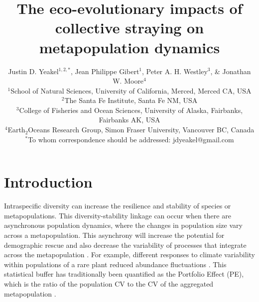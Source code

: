 \documentclass[twocolumn,preprintnumbers,amsmath,amssymb,superscriptaddress]{revtex4}
\begin{document}
\title{The eco-evolutionary impacts of collective straying on metapopulation dynamics}
\author{Justin D. Yeakel${}^{1,2,*}$, Jean Philippe Gibert${}^{1}$, Peter A. H. Westley${}^{3}$, \& Jonathan W. Moore${}^{4}$ \\
${}^1$School of Natural Sciences, University of California, Merced, Merced CA, USA \\
${}^2$The Santa Fe Institute, Santa Fe NM, USA \\
${}^3$College of Fisheries and Ocean Sciences, University of Alaska, Fairbanks, Fairbanks AK, USA \\
${}^4$Earth${}_2$Oceans Research Group, Simon Fraser University, Vancouver BC, Canada \\
${}^*$To whom correspondence should be addressed: jdyeakel@gmail.com
}



\maketitle



\section{Introduction}


Intraspecific diversity can increase the resilience and stability of species or metapopulations. 
This diversity-stability linkage can occur when there are asynchronous population dynamics, where the changes in population size vary across a metapopulation. 
This asynchrony will increase the potential for demographic rescue \cite{Earn:2000fm} and also decrease the variability of processes that integrate across the metapopulation \cite{Anonymous:2015gf}. 
For example, different responses to climate variability within populations of a rare plant reduced abundance fluctuations \cite{Abbott:2017hl}. 
This statistical buffer has traditionally been quantified as the Portfolio Effect (PE), which is the ratio of the population CV to the CV of the aggregated metapopulation \cite{Thibaut:2012km}. 
\end{document}
